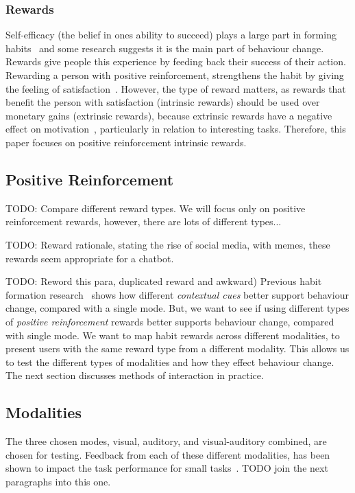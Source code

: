 \documentclass{scaffold/sigchi}
\begin{document}
\subsubsection{Rewards}
Self-efficacy (the belief in ones ability to succeed) plays a large part in forming habits~\cite{article_a_self_efficacy} and some research suggests it is the main part of behaviour change. Rewards give people this experience by feeding back their success of their action. Rewarding a person with positive reinforcement, strengthens the habit by giving the feeling of satisfaction~\cite{article_promoting_habit_formation}. However, the type of reward matters, as rewards that benefit the person with satisfaction (intrinsic rewards) should be used over monetary gains (extrinsic rewards), because extrinsic rewards have a negative effect on motivation~\cite{article_meta_analytic_review_intrinsic_motivation}, particularly in relation to interesting tasks. Therefore, this paper focuses on positive reinforcement intrinsic rewards.



\subsection{Positive Reinforcement}
TODO: Compare different reward types. We will focus only on positive reinforcement rewards, however, there are lots of different types...

TODO: Reward rationale, stating the rise of social media, with memes, these rewards seem appropriate for a chatbot.

TODO: Reword this para, duplicated reward and awkward) Previous habit formation research~\cite{article_understanding_use_contextual_cues_design_impl} shows how different \textit{contextual cues} better support behaviour change, compared with a single mode. But, we want to see if using different types of \textit{positive reinforcement} rewards better supports behaviour change, compared with single mode. We want to map habit rewards across different modalities, to present users with the same reward type from a different modality.
This allows us to test the different types of modalities and how they effect behaviour change.
The next section discusses methods of interaction in practice.

\subsection{Modalities}
The three chosen modes, visual, auditory, and visual-auditory combined, are chosen for testing. Feedback from each of these different modalities, has been shown to impact the task performance for small tasks~\cite{chi_oussama_tap_the_shapetones}. TODO join the next paragraphs into this one.
\end{document}
